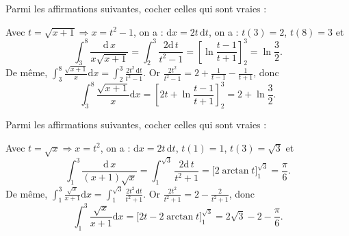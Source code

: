 \begin{question}
Parmi les affirmations suivantes, cocher celles qui sont vraies :
\begin{answers}
\end{answers}
\vskip3mm
\begin{explanations}
Avec $t=\sqrt{x+1}\Rightarrow x=t^2-1$, on a : $\mathrm{d}x=2t\, \mathrm{d}t$, on a : $t(3)=2$, $t(8)=3$ et 
$$\displaystyle \int _3^8\frac{\mathrm{d}\, x}{x\sqrt{x+1}}=\int _{2}^{3}\frac{2\mathrm{d}\, t}{t^2-1}=\left[\ln \frac{t-1}{t+1}\right]_{2}^{3}=\ln \frac{3}{2}.$$
De même, $\displaystyle \int _3^8\frac{\sqrt{x+1}}{x}\mathrm{d}x=\int _{2}^{3}\frac{2t^2\, \mathrm{d}t}{t^2-1}$. Or $\displaystyle \frac{2t^2}{t^2-1}=2+\frac{1}{t-1}-\frac{1}{t+1}$, donc
$$\displaystyle \int _3^8\frac{\sqrt{x+1}}{x}\mathrm{d}x=\left[2t+\ln \frac{t-1}{t+1}\right]_{2}^{3}=2+\ln \frac{3}{2}.$$
\end{explanations}
\end{question}

\begin{question}
Parmi les affirmations suivantes, cocher celles qui sont vraies :
\begin{answers}
\end{answers}
\vskip3mm
\begin{explanations}
Avec $t=\sqrt{x}\Rightarrow x=t^2$, on a : $\mathrm{d}x=2t\, \mathrm{d}t$, $t(1)=1$, $t(3)=\sqrt{3}$ et 
$$\displaystyle \int _1^3\frac{\mathrm{d}\, x}{(x+1)\sqrt{x}}=\int _{1}^{\sqrt{3}}\frac{2\mathrm{d}\, t}{t^2+1}=\Big[2\arctan t\Big]_{1}^{\sqrt{3}}=\frac{\pi}{6}.$$
De même, $\displaystyle \int _1^3\frac{\sqrt{x}}{x+1}\mathrm{d}x=\int _{1}^{\sqrt{3}}\frac{2t^2\, \mathrm{d}t}{t^2+1}$. Or $\displaystyle \frac{2t^2}{t^2+1}=2-\frac{2}{t^2+1}$, donc
$$\displaystyle \int _1^3\frac{\sqrt{x}}{x+1}\mathrm{d}x=\Big[2t-2\arctan t\Big]_{1}^{\sqrt{3}}=2\sqrt{3}-2-\frac{\pi}{6}.$$
\end{explanations}
\end{question}


